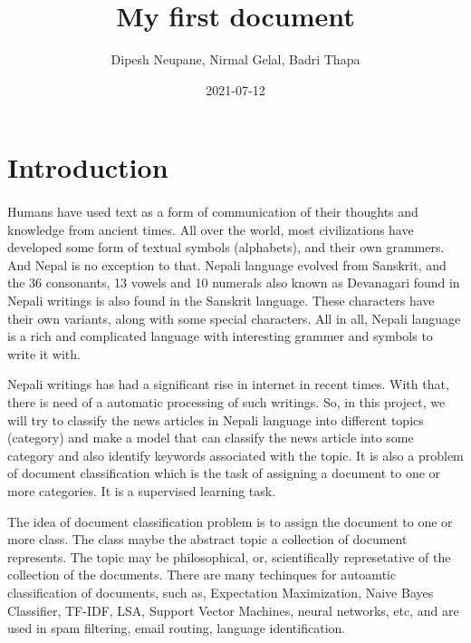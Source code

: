 \documentclass[12pt]{article}
\title{My first document}
\date{2021-07-12}
\author{Dipesh Neupane, Nirmal Gelal, Badri Thapa}
\begin{document}
    \maketitle
    \newpage
    
    \section{Introduction}
    \paragraph{}
        Humans have used text as a form of communication of their thoughts and knowledge from ancient times. All over the world, most civilizations have developed some form of textual symbols 
        (alphabets), and  their own grammers.
        And Nepal is no exception to that. Nepali language evolved from Sanskrit, and the 36 consonants, 13 vowels and 10 numerals also known as Devanagari found in Nepali writings is also found 
        in the Sanskrit language. 
        These characters have their own variants, along with some special characters. All in all, Nepali language is a rich and complicated language with interesting grammer and symbols to write it with.
        
        Nepali writings has had a significant rise in internet in recent times. With that, there is need of a automatic processing of such writings.         
        So, in this project, we will try to classify the news articles in Nepali language into different topics (category) and make a model that can classify the news article into some category 
        and also identify keywords associated with the topic. 
        It is also a problem of document classification which is the task of assigning a document to one or more categories. It is a supervised learning task. 

        The idea of document classification problem is to assign the document to one or more class. The class maybe the abstract topic a collection of document represents. The topic may be philosophical, or, scientifically represetative
        of the collection of the documents. There are many techinques for autoamtic classification of documents, such as, Expectation Maximization, Naive Bayes Classifier, TF-IDF, LSA, Support Vector Machines,
         neural networks, etc, and are used in spam filtering, email routing, language identification\cite{wikipedia2021}. 
        
\end{document}
